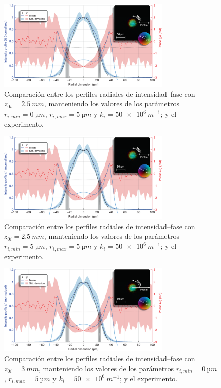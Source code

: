 \begin{figure}[htbp]
  \centering
  \includegraphics[width=0.74\textwidth]{Figuras/anx_cmp_23.png}
  \caption*{Comparación entre los perfiles radiales de intensidad--fase con $z_{0i}=\qty{2.5}{mm}$, manteniendo los valores de los parámetros $r_{i,min}=\qty{0}{µm}$, $r_{i,max}=\qty{5}{µm}$ y $k_{i}=\qty{50e6}{m^{-1}}$; y el experimento.}
\end{figure}

\begin{figure}[htbp]
  \centering
  \includegraphics[width=0.74\textwidth]{Figuras/anx_cmp_24.png}
  \caption*{Comparación entre los perfiles radiales de intensidad--fase con $z_{0i}=\qty{2.5}{mm}$, manteniendo los valores de los parámetros $r_{i,min}=\qty{5}{µm}$, $r_{i,max}=\qty{5}{µm}$ y $k_{i}=\qty{50e6}{m^{-1}}$; y el experimento.}
\end{figure}

\begin{figure}[htbp]
  \centering
  \includegraphics[width=0.74\textwidth]{Figuras/anx_cmp_25.png}
  \caption*{Comparación entre los perfiles radiales de intensidad--fase con $z_{0i}=\qty{3}{mm}$, manteniendo los valores de los parámetros $r_{i,min}=\qty{0}{µm}$, $r_{i,max}=\qty{5}{µm}$ y $k_{i}=\qty{50e6}{m^{-1}}$; y el experimento.}
\end{figure}

